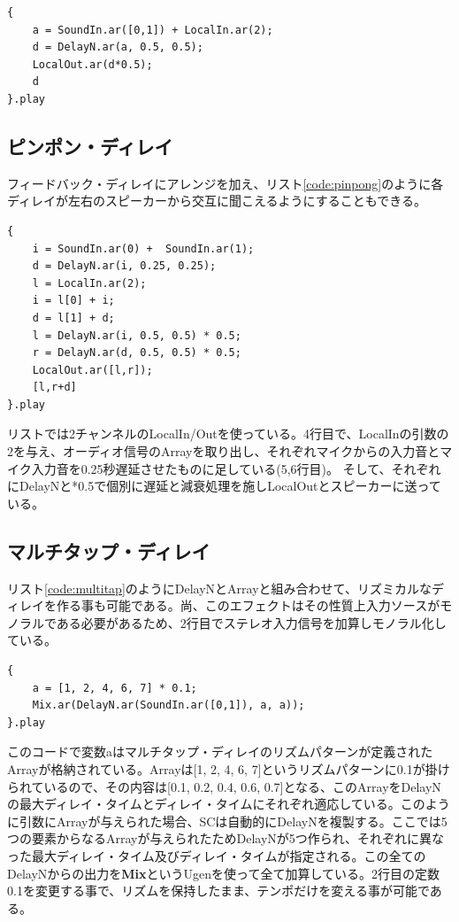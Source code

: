 \documentclass{jsarticle}
\begin{document}
\begin{lstlisting}[caption=フィードバック・ディレイ, label=code:feedback]
{
	a = SoundIn.ar([0,1]) + LocalIn.ar(2);
	d = DelayN.ar(a, 0.5, 0.5);
	LocalOut.ar(d*0.5);
	d
}.play
\end{lstlisting}

\subsection{ピンポン・ディレイ}
フィードバック・ディレイにアレンジを加え、リスト\ref{code:pinpong}のように各ディレイが左右のスピーカーから交互に聞こえるようにすることもできる。

\begin{lstlisting}[caption=ピンポン・ディレイ, label=code:pingpong]
{
	i = SoundIn.ar(0) +  SoundIn.ar(1);
	d = DelayN.ar(i, 0.25, 0.25);
	l = LocalIn.ar(2);
	i = l[0] + i;
	d = l[1] + d;
	l = DelayN.ar(i, 0.5, 0.5) * 0.5; 
	r = DelayN.ar(d, 0.5, 0.5) * 0.5;
	LocalOut.ar([l,r]);
	[l,r+d]
}.play
\end{lstlisting}

リストでは2チャンネルのLocalIn/Outを使っている。4行目で、LocalInの引数の2を与え、オーディオ信号のArrayを取り出し、それぞれマイクからの入力音とマイク入力音を0.25秒遅延させたものに足している(5,6行目)。
そして、それぞれにDelayNと*0.5で個別に遅延と減衰処理を施しLocalOutとスピーカーに送っている。

\subsection{マルチタップ・ディレイ}
リスト\ref{code:multitap}のようにDelayNとArrayと組み合わせて、リズミカルなディレイを作る事も可能である。尚、このエフェクトはその性質上入力ソースがモノラルである必要があるため、2行目でステレオ入力信号を加算しモノラル化している。

\begin{lstlisting}[caption=マルチタップ・ディレイ, label=code:multitap]
{
	a = [1, 2, 4, 6, 7] * 0.1;
	Mix.ar(DelayN.ar(SoundIn.ar([0,1]), a, a));
}.play
\end{lstlisting}

このコードで変数aはマルチタップ・ディレイのリズムパターンが定義されたArrayが格納されている。Arrayは[1, 2, 4, 6, 7]というリズムパターンに0.1が掛けられているので、その内容は[0.1, 0.2, 0.4, 0.6, 0.7]となる、このArrayをDelayNの最大ディレイ・タイムとディレイ・タイムにそれぞれ適応している。このように引数にArrayが与えられた場合、SCは自動的にDelayNを複製する。ここでは5つの要素からなるArrayが与えられたためDelayNが5つ作られ、それぞれに異なった最大ディレイ・タイム及びディレイ・タイムが指定される。この全てのDelayNからの出力を{\bf Mix}というUgenを使って全て加算している。2行目の定数0.1を変更する事で、リズムを保持したまま、テンポだけを変える事が可能である。
\end{document}
